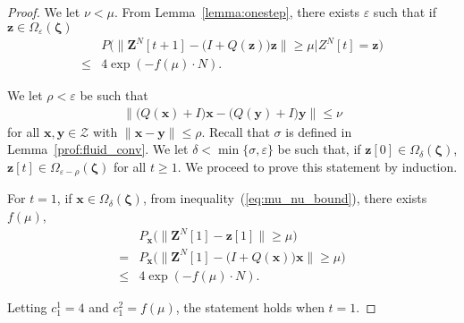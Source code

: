 \documentclass[11pt,twocolumn]{IEEEtran}
\begin{document}
\begin{proof}
We let $\nu<\mu$. From Lemma~\ref{lemma:onestep}, there exists $\varepsilon$ such that if $\bm z \in \Omega_{\varepsilon}(\bm \zeta)$
\begin{align}
&P\Big( \big\| \bm Z^{N}[t+1]-\big(I+Q(\bm z)\big)\bm z \big\| \geq \mu \Big| Z^{N}[t]=\bm z\Big)\nonumber\\
\leq& 4 \exp(-f(\mu)\cdot N). \label{eq:mu_nu_bound}
\end{align}

We let $\rho < \varepsilon$ be such that
\begin{align}
\label{eq:rho_bound}
\big\|\big(Q(\bm x)+I\big)\bm x - \big(Q(\bm y)+I\big) \bm y \big\| \leq \nu
\end{align}
for all $\bm x, \bm y \in \mathcal{Z}$ with $\big\|\bm x - \bm y\big\| \leq \rho.$
Recall that $\sigma$ is defined in Lemma~\ref{prof:fluid_conv}. We let $\delta<\min\{\sigma, \varepsilon \}$ be such that, if $\bm z[0] \in \Omega_{\delta}(\bm \zeta)$, $\bm z[t] \in \Omega_{\varepsilon-\rho}(\bm \zeta)$ for all $t\geq 1$. We proceed to prove this statement by induction.
\vspace{3pt}

For $t=1$, if $\bm x \in \Omega_{\delta}(\bm \zeta)$, from inequality~(\ref{eq:mu_nu_bound}), there exists $f(\mu)$,
\begin{align}
\nonumber
&P_{\bm x}(\big\| \bm Z^{N}[1]-\bm z[1] \big\| \geq \mu \Big)\nonumber\\
=&P_{\bm x}(\big\| \bm Z^{N}[1]-\big(I+Q(\bm x)\big)\bm x \big\| \geq \mu \Big)\nonumber\\
\leq& 4\exp(-f(\mu)\cdot N).
\end{align}

Letting $c_1^1=4$ and $c_1^2=f(\mu)$, the statement holds when $t=1$.


\end{proof}
\end{document}
